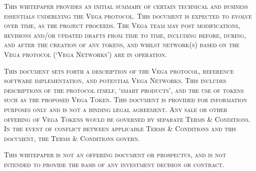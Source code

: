 \pagestyle{plain}
\lhead[{}{}]       {{}{}}
\rhead[{}{}]       {{}{}}

\begin{small}
\noindent \textsc{This whitepaper provides an initial summary of certain technical and business essentials underlying the Vega protocol. This document is expected to evolve over time, as the project proceeds. The Vega team may post modifications, revisions and/or updated drafts from time to time, including before, during, and after the creation of any tokens, and whilst network(s) based on the Vega protocol (`Vega Networks') are in operation.}

\textsc{This document sets forth a description of the Vega protocol, reference software implementation, and potential Vega Networks. This includes descriptions of the protocol itself, `smart products', and the use of tokens such as the proposed Vega Token. This document is provided for information purposes only and is not a binding legal agreement. Any sale or other offering of Vega Tokens would be governed by separate Terms \& Conditions. In the event of conflict between applicable Terms \& Conditions and this document, the Terms \& Conditions govern.}
 
\textsc{This whitepaper is not an offering document or prospectus, and is not intended to provide the basis of any investment decision or contract.}\par
\end{small}


